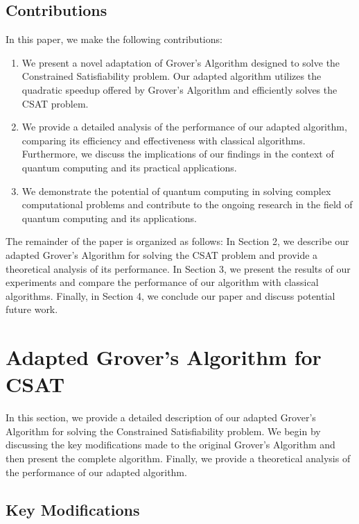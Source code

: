 \subsection{Contributions}

In this paper, we make the following contributions:

\begin{enumerate}
    \item We present a novel adaptation of Grover's Algorithm designed to solve the Constrained Satisfiability problem. Our adapted algorithm utilizes the quadratic speedup offered by Grover's Algorithm and efficiently solves the CSAT problem.
    
    \item We provide a detailed analysis of the performance of our adapted algorithm, comparing its efficiency and effectiveness with classical algorithms. Furthermore, we discuss the implications of our findings in the context of quantum computing and its practical applications.
    
    \item We demonstrate the potential of quantum computing in solving complex computational problems and contribute to the ongoing research in the field of quantum computing and its applications.
\end{enumerate}

The remainder of the paper is organized as follows: In Section 2, we describe our adapted Grover's Algorithm for solving the CSAT problem and provide a theoretical analysis of its performance. In Section 3, we present the results of our experiments and compare the performance of our algorithm with classical algorithms. Finally, in Section 4, we conclude our paper and discuss potential future work.

\section{Adapted Grover's Algorithm for CSAT}

In this section, we provide a detailed description of our adapted Grover's Algorithm for solving the Constrained Satisfiability problem. We begin by discussing the key modifications made to the original Grover's Algorithm and then present the complete algorithm. Finally, we provide a theoretical analysis of the performance of our adapted algorithm.

\subsection{Key Modifications}

